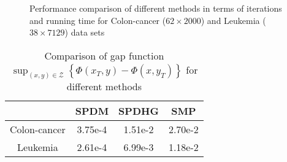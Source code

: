 \documentclass[letterpaper,11 pt]{article}
\begin{document}
\begin{figure}[htb]
    \centering
   \caption{ Performance comparison of different methods in terms of iterations and running time for Colon-cancer ($62\times 2000$) and Leukemia ($38\times 7129$) data sets}
    \label{fig:dro1}\vspace{-3mm}
\end{figure}   
   
     


     \begin{table}[htb]
\centering
\caption{Comparison of gap function 
$\sup_{(x,y)\in\mathcal Z}\left\{\Phi( x_T,y)-\Phi(x, y_T)\right\}$ for different methods }
\begin{tabular}{|c|c|c|c|}\hline
      &SPDM&SPDHG&SMP  \\ \hline
      Colon-cancer& 3.75e-4&1.51e-2&2.70e-2\\ \hline
      Leukemia&2.61e-4&6.99e-3&1.18e-2\\ \hline
    \end{tabular}
\label{tabel_dro}
\end{table}
\end{document}

